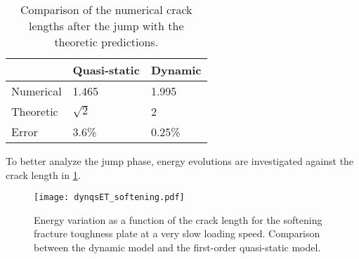 \begin{table}[htbp]
\centering
\caption{Comparison of the numerical crack lengths after the jump with the theoretic predictions.} \label{tab:compljump}
\begin{tabular}{lll} \toprule
& Quasi-static & Dynamic \\ \midrule
Numerical & 1.465 & 1.995 \\
Theoretic & $\sqrt{2}$ & 2 \\
Error & 3.6\% & 0.25\% \\ \bottomrule
\end{tabular}
\end{table}

To better analyze the jump phase, energy evolutions are investigated against the crack length in \cref{fig:evoRNJjump}.
\begin{figure}[htbp]
\centering
\texttt{[image: dynqsET\_softening.pdf]}
\caption{Energy variation as a function of the crack length for the softening fracture toughness plate at a very slow loading speed. Comparison between the dynamic model and the first-order quasi-static model.} \label{fig:evoRNJjump}
\end{figure}

